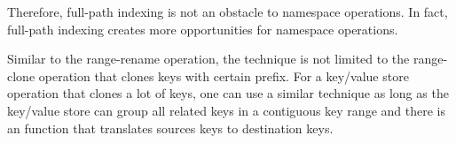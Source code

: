 Therefore, full-path indexing is not an obstacle to namespace operations.
In fact, full-path indexing creates more opportunities for namespace operations.

Similar to the range-rename operation, the technique is not limited to the
range-clone operation that clones keys with certain prefix.
For a key/value store operation that clones a lot of keys,
one can use a similar technique as long as the key/value store can group all
related keys in a contiguous key range and
there is an \xf function that translates sources keys to destination keys.

